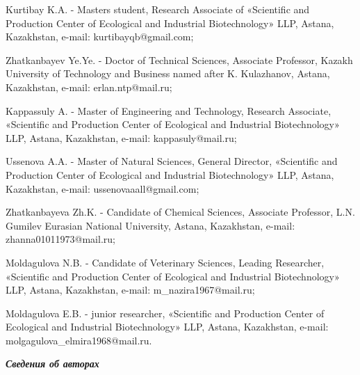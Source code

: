 \begin{noparindent}
Kurtibay K.A. - Master\textquotesingle s student, Research Associate of
«Scientific and Production Center of Ecological and Industrial
Biotechnology» LLP, Astana, Kazakhstan, e-mail: kurtibayqb@gmail.com;

Zhatkanbayev Ye.Ye. - Doctor of Technical Sciences, Associate Professor,
Kazakh University of Technology and Business named after K. Kulazhanov,
Astana, Kazakhstan, e-mail: erlan.ntp@mail.ru;

Kappassuly A. - Master of Engineering and Technology, Research
Associate, «Scientific and Production Center of Ecological and
Industrial Biotechnology» LLP, Astana, Kazakhstan, e-mail:
kappasuly@mail.ru;

Ussenova A.A. - Master of Natural Sciences, General Director,
«Scientific and Production Center of Ecological and Industrial
Biotechnology» LLP, Astana, Kazakhstan, e-mail: ussenovaaall@gmail.com;

Zhatkanbayeva Zh.K. - Candidate of Chemical Sciences, Associate
Professor, L.N. Gumilev Eurasian National University, Astana,
Kazakhstan, e-mail: zhanna01011973@mail.ru;

Moldagulova N.B. - Candidate of Veterinary Sciences, Leading Researcher,
«Scientific and Production Center of Ecological and Industrial
Biotechnology» LLP, Astana, Kazakhstan, e-mail: m\_nazira1967@mail.ru;

Moldagulova E.B. - junior researcher, «Scientific and Production Center
of Ecological and Industrial Biotechnology» LLP, Astana, Kazakhstan,
e-mail: molgagulova\_elmira1968@mail.ru.
\end{noparindent}

\emph{{\bfseries Сведения об авторах}}

